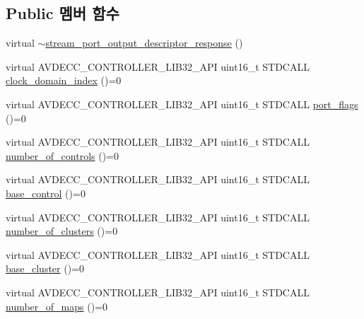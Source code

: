 \subsection*{Public 멤버 함수}
\begin{DoxyCompactItemize}
\item 
virtual \hyperlink{classavdecc__lib_1_1stream__port__output__descriptor__response_a7cf806ae5ce74045287639c5c5fbe22f}{$\sim$stream\+\_\+port\+\_\+output\+\_\+descriptor\+\_\+response} ()
\item 
virtual A\+V\+D\+E\+C\+C\+\_\+\+C\+O\+N\+T\+R\+O\+L\+L\+E\+R\+\_\+\+L\+I\+B32\+\_\+\+A\+PI uint16\+\_\+t S\+T\+D\+C\+A\+LL \hyperlink{classavdecc__lib_1_1stream__port__output__descriptor__response_aab7f93d403d8b73f8f4a8fb7c61ecded}{clock\+\_\+domain\+\_\+index} ()=0
\item 
virtual A\+V\+D\+E\+C\+C\+\_\+\+C\+O\+N\+T\+R\+O\+L\+L\+E\+R\+\_\+\+L\+I\+B32\+\_\+\+A\+PI uint16\+\_\+t S\+T\+D\+C\+A\+LL \hyperlink{classavdecc__lib_1_1stream__port__output__descriptor__response_a66bad2f1317cba04f0ea271f7181b58f}{port\+\_\+flags} ()=0
\item 
virtual A\+V\+D\+E\+C\+C\+\_\+\+C\+O\+N\+T\+R\+O\+L\+L\+E\+R\+\_\+\+L\+I\+B32\+\_\+\+A\+PI uint16\+\_\+t S\+T\+D\+C\+A\+LL \hyperlink{classavdecc__lib_1_1stream__port__output__descriptor__response_a5accf7abc7d231a0767ad5cac68b8b39}{number\+\_\+of\+\_\+controls} ()=0
\item 
virtual A\+V\+D\+E\+C\+C\+\_\+\+C\+O\+N\+T\+R\+O\+L\+L\+E\+R\+\_\+\+L\+I\+B32\+\_\+\+A\+PI uint16\+\_\+t S\+T\+D\+C\+A\+LL \hyperlink{classavdecc__lib_1_1stream__port__output__descriptor__response_ac1f5297533142234c764e84c01ce5a16}{base\+\_\+control} ()=0
\item 
virtual A\+V\+D\+E\+C\+C\+\_\+\+C\+O\+N\+T\+R\+O\+L\+L\+E\+R\+\_\+\+L\+I\+B32\+\_\+\+A\+PI uint16\+\_\+t S\+T\+D\+C\+A\+LL \hyperlink{classavdecc__lib_1_1stream__port__output__descriptor__response_a2ea8849b4f2d61dd26ed53e94316e93e}{number\+\_\+of\+\_\+clusters} ()=0
\item 
virtual A\+V\+D\+E\+C\+C\+\_\+\+C\+O\+N\+T\+R\+O\+L\+L\+E\+R\+\_\+\+L\+I\+B32\+\_\+\+A\+PI uint16\+\_\+t S\+T\+D\+C\+A\+LL \hyperlink{classavdecc__lib_1_1stream__port__output__descriptor__response_aa87ccba6a00a404146e569e70185d839}{base\+\_\+cluster} ()=0
\item 
virtual A\+V\+D\+E\+C\+C\+\_\+\+C\+O\+N\+T\+R\+O\+L\+L\+E\+R\+\_\+\+L\+I\+B32\+\_\+\+A\+PI uint16\+\_\+t S\+T\+D\+C\+A\+LL \hyperlink{classavdecc__lib_1_1stream__port__output__descriptor__response_acda32e14eb207ebd11856fab5172173c}{number\+\_\+of\+\_\+maps} ()=0

\end{DoxyCompactItemize}
